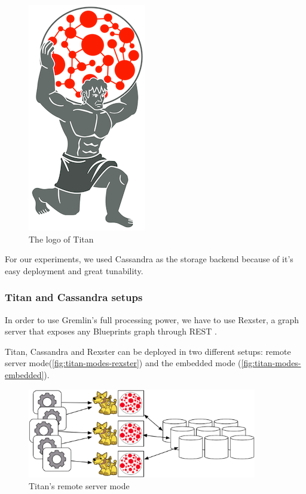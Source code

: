 \begin{figure}
\begin{center}
\includegraphics[]{figures/titan-logo}
\caption{The logo of Titan}
\label{fig:titan-logo}
\end{center}
\end{figure}

For our experiments, we used Cassandra as the storage backend because of it's easy deployment and great tunability.

\subsubsection{Titan and Cassandra setups}

In order to use Gremlin's full processing power, we have to use Rexster, a graph server that exposes any Blueprints graph through REST \cite{Rexster}.

Titan, Cassandra and Rexster can be deployed in two different setups: remote server mode(\autoref{fig:titan-modes-rexster}) and the embedded mode (\autoref{fig:titan-modes-embedded}).

\begin{figure}
\begin{center}
\includegraphics[width=10cm]{figures/titan-modes-rexster}
\caption{Titan's remote server mode}
\label{fig:titan-modes-rexster}
\end{center}
\end{figure}

